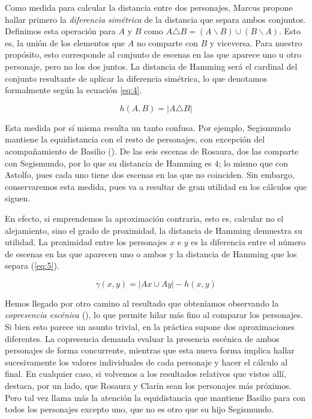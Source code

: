 

Como medida para calcular la distancia entre dos personajes, Marcus propone hallar primero la \textit{diferencia simétrica} de la distancia que separa ambos conjuntos. Definimos esta operación para $A$ y $B$ como	$A \triangle B = (A \smallsetminus B) \cup (B \smallsetminus A)$. Esto es, la unión de los elementos que $A$ no comparte con $B$ y viceversa. Para nuestro propósito, esto corresponde al conjunto de escenas en las que aparece uno u otro personaje, pero no los dos juntos. La distancia de Hamming será el cardinal del conjunto resultante de aplicar la diferencia simétrica, lo que denotamos formalmente según la ecuación \ref{eq:4}.

\begin{equation}\label{eq:4}
	h(A,B) = \lvert A \triangle B\rvert
\end{equation}

Esta medida por sí misma resulta un tanto confusa. Por ejemplo, Segismundo mantiene la equidistancia con el resto de personajes, con excepción del acompañamiento de Basilio (). De las seis escenas de Rosaura, dos las comparte con Segismundo, por lo que su distancia de Hamming es $4$; lo mismo que con Astolfo, pues cada uno tiene dos escenas en las que no coinciden. Sin embargo, conservaremos esta medida, pues va a resultar de gran utilidad en los cálculos que siguen.



En efecto, si emprendemos la aproximación contraria, esto es, calcular no el alejamiento, sino el grado de proximidad, la distancia de Hamming demuestra su utilidad. La proximidad entre los personajes $x$ e $y$ es la diferencia entre el número de escenas en las que aparecen uno o ambos y la distancia de Hamming que los separa (\ref{eq:5}).

\begin{equation}\label{eq:5}
	\gamma(x,y) = \lvert Ax \cup Ay\rvert -  h(x, y)
\end{equation}

Hemos llegado por otro camino al resultado que obteníamos observando la \textit{copresencia escénica} (), lo que permite hilar más fino al comparar los personajes. Si bien esto parece un asunto trivial, en la práctica supone dos aproximaciones diferentes. La copresencia demanda evaluar la presencia escénica de ambos personajes de forma concurrente, mientras que esta nueva forma implica hallar sucesivamente los valores individuales de cada personaje y hacer el cálculo al final. En cualquier caso, si volvemos a los resultados relativos que vistos allí, destaca, por un lado, que Rosaura y Clarín sean los personajes más próximos. Pero tal vez llama más la atención la equidistancia que mantiene Basilio para con todos los personajes excepto uno, que no es otro que su hijo Segismundo.

